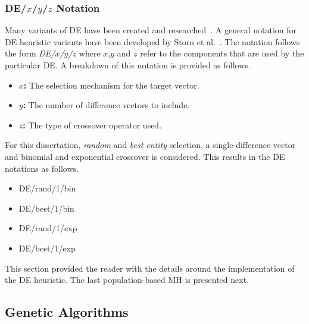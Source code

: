 \subsubsection{DE/$x$/$y$/$z$ Notation}

Many variants of \ac{DE} have been created and researched~\cite{ref:mezura:2006}. A general notation for \ac{DE} heuristic variants have been developed by Storn et al.~\cite{ref:storn:1996}\cite{ref:storn:1997}. The notation follows the form \textit{DE/$x$/$y$/$z$} where $x$,$y$ and $z$ refer to the components that are used by the particular \ac{DE}. A breakdown of this notation is provided as follows.

\begin{itemize}
      \item \textbf{$x$:} The selection mechanism for the target vector.
      \item \textbf{$y$:} The number of difference vectors to include.
      \item \textbf{$z$:} The type of crossover operator used.
\end{itemize}

For this dissertation, \textit{random} and \textit{best entity} selection, a single difference vector and binomial and exponential crossover is considered. This results in the \acs{DE} notations as follows.

\begin{itemize}
      \item DE/rand/1/bin
      \item DE/best/1/bin
      \item DE/rand/1/exp
      \item DE/best/1/exp
\end{itemize}

This section provided the reader with the details around the implementation of the \acs{DE} heuristic. The last population-based \ac{MH} is presented next.


\subsection{Genetic Algorithms}
\label{sec:heuristics:mh:ga}

